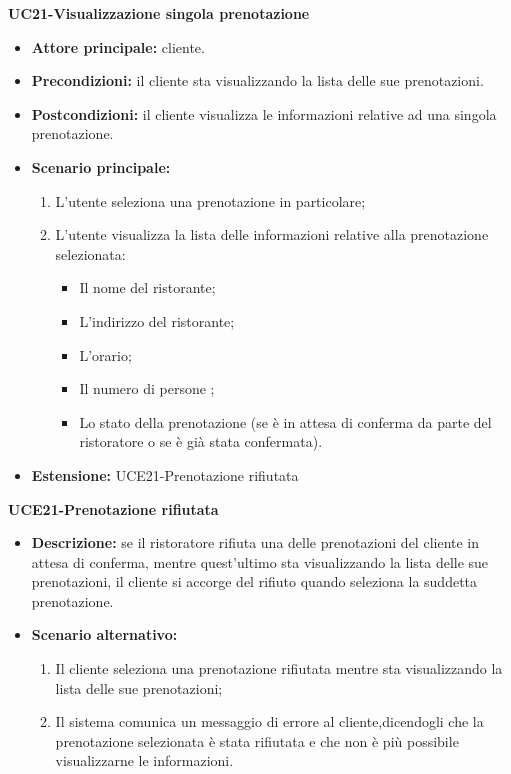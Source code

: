 \textbf{UC21-Visualizzazione singola prenotazione}
\begin{itemize}
    \item \textbf{Attore principale: } cliente.
    \item \textbf{Precondizioni: }il cliente sta visualizzando la lista delle sue prenotazioni.
    \item \textbf{Postcondizioni: }il cliente visualizza le informazioni relative ad una singola prenotazione.
    \item \textbf{Scenario principale:} 
        \begin{enumerate}
            \item L'utente seleziona una prenotazione in particolare;
            \item L'utente visualizza la lista delle informazioni relative alla prenotazione selezionata:
            \begin{itemize}
                \item Il nome del ristorante;
                \item L'indirizzo del ristorante;
                \item L'orario;
                \item Il numero di persone ;
                \item Lo stato della prenotazione (se è in attesa di conferma da parte del ristoratore
                o se è già stata confermata).
            \end{itemize}
        \end{enumerate}
    \item \textbf{Estensione: }UCE21-Prenotazione rifiutata
\end{itemize}

\textbf{UCE21-Prenotazione rifiutata}
\begin{itemize}
    \item \textbf{Descrizione: }se il ristoratore rifiuta una delle prenotazioni del cliente in attesa di conferma,
    mentre quest'ultimo sta visualizzando la lista delle sue prenotazioni, il cliente si accorge del rifiuto quando
    seleziona la suddetta prenotazione.
    \item \textbf{Scenario alternativo: }
    \begin{enumerate}
        \item Il cliente seleziona una prenotazione rifiutata mentre sta visualizzando la lista 
        delle sue prenotazioni;
        \item Il sistema comunica un messaggio di errore al cliente,dicendogli che la prenotazione selezionata 
        è stata rifiutata e che non è più possibile visualizzarne le informazioni.
    \end{enumerate}
\end{itemize}

